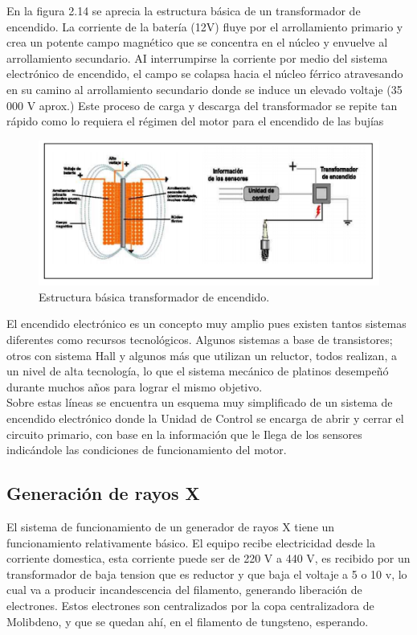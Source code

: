En la figura 2.14 se aprecia la estructura básica de un transformador
de encendido. La corriente de la batería (12V) fluye por el arrollamiento
primario y crea un potente campo magnético que se concentra en el
núcleo y envuelve al arrollamiento secundario. AI interrumpirse la corriente
por medio del sistema electrónico de encendido, el campo se colapsa
hacia el núcleo férrico atravesando en su camino al arrollamiento
secundario donde se induce un elevado voltaje (35 000 V aprox.) Este
proceso de carga y descarga del transformador se repite tan rápido como
lo requiera el régimen del motor para el encendido de las bujías


\begin{figure}[H]
\centering
\includegraphics[width=12cm]{capitulo3/figs/trans3.png}
\caption{ Estructura básica transformador de encendido.}
\end{figure}

El encendido electrónico es un concepto muy amplio pues existen
tantos sistemas diferentes como recursos tecnológicos. Algunos sistemas
a base de transistores; otros con sistema Hall y algunos más que utilizan
un reluctor, todos realizan, a un nivel de alta tecnología, lo que el sistema
mecánico de platinos desempeñó durante muchos años para lograr el
mismo objetivo.\\

Sobre estas líneas se encuentra un esquema muy simplificado de
un sistema de encendido electrónico donde la Unidad de Control se
encarga de abrir y cerrar el circuito primario, con base en la información
que le Ilega de los sensores indicándole las condiciones de
funcionamiento del motor. \cite{ignicion}

\subsection{Generación de rayos X}

El sistema de funcionamiento de un generador de rayos X tiene un funcionamiento relativamente básico.  El equipo recibe electricidad desde la corriente domestica, esta corriente puede ser de 220 V a 440 V, es recibido por un transformador de baja tension que es reductor y que baja el voltaje a 5 o 10 v, lo cual va a producir incandescencia del filamento, generando liberación de electrones. Estos electrones son centralizados por la copa centralizadora de Molibdeno, y que se quedan ahí, en el filamento de tungsteno, esperando. \\

